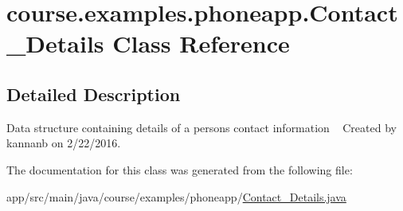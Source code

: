 \hypertarget{classcourse_1_1examples_1_1phoneapp_1_1_contact___details}{}\section{course.\+examples.\+phoneapp.\+Contact\+\_\+\+Details Class Reference}
\label{classcourse_1_1examples_1_1phoneapp_1_1_contact___details}


\subsection{Detailed Description}
Data structure containing details of a person\textquotesingle{}s contact information ~\newline
 Created by kannanb on 2/22/2016. 

The documentation for this class was generated from the following file\+:\begin{DoxyCompactItemize}
\item 
app/src/main/java/course/examples/phoneapp/\hyperlink{_contact___details_8java}{Contact\+\_\+\+Details.\+java}\end{DoxyCompactItemize}
